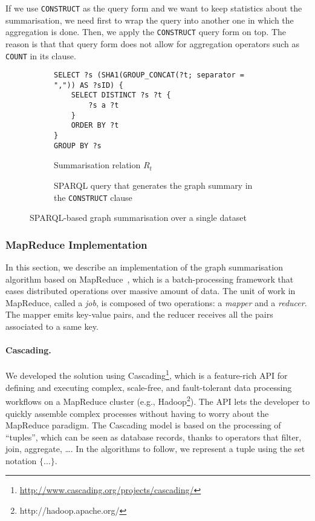 \begin{remark}
If we use \texttt{CONSTRUCT} as the query form and we want to keep statistics about the summarisation, we need first to wrap the query into another one in which the aggregation is done. Then, we apply the \texttt{CONSTRUCT} query form on top. The reason is that that query form does not allow for aggregation operators such as \texttt{COUNT} in its clause.
\end{remark}

\begin{figure}
	\centering
	\begin{subfigure}{\textwidth}
		\centering
		{\footnotesize
			\begin{verbatim}
SELECT ?s (SHA1(GROUP_CONCAT(?t; separator = ",")) AS ?sID) {
    SELECT DISTINCT ?s ?t {
        ?s a ?t
    }
    ORDER BY ?t
}
GROUP BY ?s
			\end{verbatim}
		}
		\caption{Summarisation relation $R_t$}
		\label{fig:relation-sparql}
	\end{subfigure}
	\qquad
	\begin{subfigure}{\textwidth}
		\centering
		{\footnotesize
			
		}
		\caption{SPARQL query that generates the graph summary in the \texttt{CONSTRUCT} clause}
		\label{fig:sparql-gs}
	\end{subfigure}
	\caption{SPARQL-based graph summarisation over a single dataset}
	\label{fig:gs-sparql-all}
\end{figure}

\subsubsection{MapReduce Implementation}
\label{sec:mapreduce}

In this section, we describe an implementation of the graph summarisation algorithm based on MapReduce~\cite{dean:2004:msd}, which is a batch-processing framework that eases distributed operations over massive amount of data. The unit of work in MapReduce, called a \emph{job}, is composed of two operations: a \emph{mapper} and a \emph{reducer}. The mapper emits key-value pairs, and the reducer receives all the pairs associated to a same key.

\paragraph{Cascading.}

We developed the solution using Cascading\footnote{\url{http://www.cascading.org/projects/cascading/}}, which is a feature-rich API for defining and executing complex, scale-free, and fault-tolerant data processing workflows on a MapReduce cluster (e.g., Hadoop\footnote{http://hadoop.apache.org/}). The API lets the developer to quickly assemble complex processes without having to worry about the MapReduce paradigm. The Cascading model is based on the processing of ``tuples'', which can be seen as database records, thanks to operators that filter, join, aggregate, \ldots.  In the algorithms to follow, we represent a tuple using the set notation $\{\ldots\}$.

